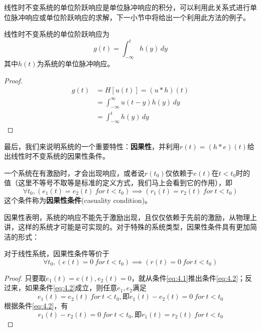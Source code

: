 线性时不变系统的单位阶跃响应是单位脉冲响应的积分，可以利用此关系式进行单位脉冲响应或单位阶跃响应的求解，下一小节中将给出一个利用此方法的例子。

\begin{proposition}[单位阶跃响应]
线性时不变系统的单位阶跃响应为
$$g(t)=\int_{-\infty}^{t}h(y)\,dy$$
其中$h(t)$为系统的单位脉冲响应。
\end{proposition}
\begin{proof}
\begin{align*}
    g(t)&=H[u(t)]=(u*h)(t)\\
    &=\int_{-\infty}^{\infty}u(t-y)h(y)\,dy\\
    &=\int_{-\infty}^{t}h(y)\,dy
\end{align*}
\end{proof}

最后，我们来说明系统的一个重要特性：\textbf{因果性}，并利用$r(t)=(h*e)(t)$给出线性时不变系统的因果性条件。

\begin{definition}[因果性]
一个系统在有激励时，才会出现响应，或者说$r(t_0)$仅依赖于$e(t)$在$t<t_0$时的值（这里不等号不取等是标准的定义方式，我们马上会看到它的作用），即
\begin{equation}
    \forall t_0,\left(e_1(t)=e_2(t)\ for\ t<t_0\right)\implies \left(r_1(t)=r_2(t)\ for\ t<t_0\right)\label{eq:4.1}
\end{equation}
这个条件称为\textbf{因果性条件}(casuality condition)。
\end{definition}

因果性表明，系统的响应不能先于激励出现，且仅仅依赖于先前的激励，从物理上讲，这样的系统才可能是可实现的。对于特殊的系统类型，因果性条件具有更加简洁的形式：

\begin{proposition}
对于线性系统，因果性条件等价于
\begin{equation}
    \forall t_0,\left(e(t)=0\ for\ t<t_0\right)\implies \left(r(t)=0\ for\ t<t_0\right)\label{eq:4.2}
\end{equation}
\end{proposition}
\begin{proof}
只要取$e_1(t)=e(t),e_2(t)=0$，就从条件\ref{eq:4.1}推出条件\ref{eq:4.2}；反过来，如果条件\ref{eq:4.2}成立，则任意$e_1,e_2$满足
$$e_1(t)=e_2(t)\ for\ t<t_0,\text{即}e_1(t)-e_2(t)=0\ for\ t<t_0$$
根据条件\ref{eq:4.2}，有
$$r_1(t)-r_2(t)=0\ for\ t<t_0,\text{即}r_1(t)=r_2(t)\ for\ t<t_0$$
\end{proof}

